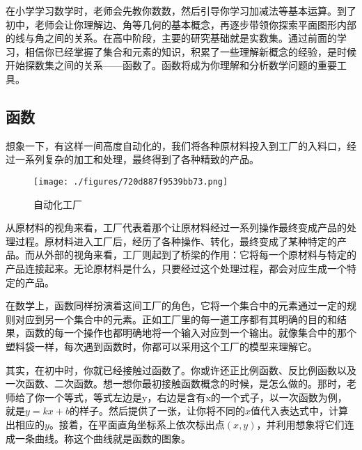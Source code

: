 

\begin{issues}
\issueDraft
\end{issues}


在小学学习数学时，老师会先教你数数，然后引导你学习加减法等基本运算。到了初中，老师会让你理解边、角等几何的基本概念，再逐步带领你探索平面图形内部的线与角之间的关系。在高中阶段，主要的研究基础就是实数集。通过前面的学习，相信你已经掌握了集合和元素的知识，积累了一些理解新概念的经验，是时候开始探数集之间的关系——函数了。函数将成为你理解和分析数学问题的重要工具。

\subsection{函数}

想象一下，有这样一间高度自动化的，我们将各种原材料投入到工厂的入料口，经过一系列复杂的加工和处理，最终得到了各种精致的产品。

\begin{figure}[ht]
\centering
\texttt{[image: ./figures/720d887f9539bb73.png]}
\caption{自动化工厂} \label{fig_functi_1}
\end{figure}

从原材料的视角来看，工厂代表着那个让原材料经过一系列操作最终变成产品的处理过程。原材料进入工厂后，经历了各种操作、转化，最终变成了某种特定的产品。而从外部的视角来看，工厂则起到了桥梁的作用：它将每一个原材料与特定的产品连接起来。无论原材料是什么，只要经过这个处理过程，都会对应生成一个特定的产品。

在数学上，函数同样扮演着这间工厂的角色，它将一个集合中的元素通过一定的规则对应到另一个集合中的元素。正如工厂里的每一道工序都有其明确的目的和结果，函数的每一个操作也都明确地将一个输入对应到一个输出。就像集合中的那个塑料袋一样，每次遇到函数时，你都可以采用这个工厂的模型来理解它。

其实，在初中时，你就已经接触过函数了。你或许还正比例函数、反比例函数以及一次函数、二次函数。想一想你最初接触函数概念的时候，是怎么做的。那时，老师给了你一个等式，等式左边是y，右边是含有x的一个式子，以一次函数为例，就是$y=kx+b$的样子。然后提供了一张，让你将不同的$x$值代入表达式中，计算出相应的$y$。接着，在平面直角坐标系上依次标出点$(x,y)$，并利用想象将它们连成一条曲线。称这个曲线就是函数的图象。

